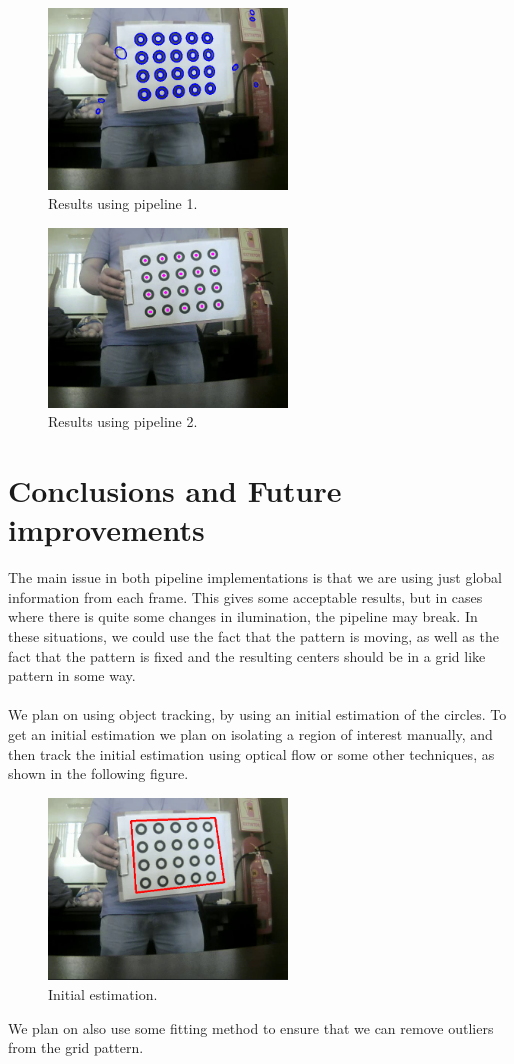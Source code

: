 \documentclass[journal]{IEEEtran}
\begin{document}
\begin{figure}[H]
\centering
\includegraphics[width=2.5in]{../_img/img_results_p1.png}
\caption{Results using pipeline 1.}
\end{figure}
%
\begin{figure}[H]
\centering
\includegraphics[width=2.5in]{../_img/img_results_p2.png}
\caption{Results using pipeline 2.}
\end{figure}
%
\section{Conclusions and Future improvements}
The main issue in both pipeline implementations is that we are using just global information from each frame. This gives some acceptable results, but in cases where there is quite some changes in ilumination, the pipeline may break. In these situations, we could use the fact that the pattern is moving, as well as the fact that the pattern is fixed and the resulting centers should be in a grid like pattern in some way.
\\
\\
We plan on using object tracking, by using an initial estimation of the circles. To get an initial estimation we plan on isolating a region of interest manually, and then track the initial estimation using optical flow or some other techniques, as shown in the following figure.
\\
\begin{figure}[H]
\centering
\includegraphics[width=2.5in]{../_img/img_results_fut_1.png}
\caption{Initial estimation.}
\end{figure}
%
We plan on also use some fitting method to ensure that we can remove outliers from the grid pattern.
\end{document}

